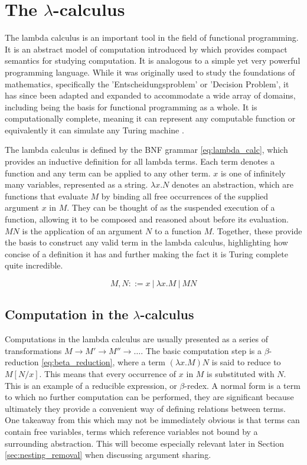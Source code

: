 \documentclass[12pt,a4paper]{report}
\theoremstyle{definition}
\theoremstyle{remark}
\begin{document}
\section{The \texorpdfstring{$\lambda$}{lambda}-calculus}
The lambda calculus is an important tool in the field of functional programming. It is an abstract model of computation introduced by \cite{church_1936} which provides compact semantics for studying computation. It is analogous to a simple yet very powerful programming language. While it was originally used to study the foundations of mathematics, specifically the 'Entscheidungsproblem' or 'Decision Problem', it has since been adapted and expanded to accommodate a wide array of domains, including being the basis for functional programming as a whole. It is computationally complete, meaning it can represent any computable function or equivalently it can simulate any Turing machine \cite{turing_1937}.

The lambda calculus is defined by the BNF grammar \eqref{eq:lambda_calc}, which provides an inductive definition for all lambda terms. Each term denotes a function and any term can be applied to any other term. $x$ is one of infinitely many variables, represented as a string. $\lambda x.N$ denotes an abstraction, which are functions that evaluate $M$ by binding all free occurrences of the supplied argument $x$ in $M$. They can be thought of as the suspended execution of a function, allowing it to be composed and reasoned about before its evaluation. $MN$ is the application of an argument $N$ to a function $M$. Together, these provide the basis to construct any valid term in the lambda calculus, highlighting how concise of a definition it has and further making the fact it is Turing complete quite incredible.

\begin{equation}\label{eq:lambda_calc}
    M,N ::= x\ |\ \lambda x.M\ |\ MN
\end{equation}
\subsection{Computation in the \texorpdfstring{$\lambda$}{lambda}-calculus}

Computations in the lambda calculus are usually presented as a series of transformations $M \rightarrow M' \rightarrow M'' \rightarrow \ldots$. The basic computation step is a $\beta$-reduction \eqref{eq:beta_reduction}, where a term $(\lambda x.M)N$ is said to reduce to $M[N/x]$. This means that every occurrence of $x$ in $M$ is substituted with $N$. This is an example of a reducible expression, or $\beta$-redex. A normal form is a term to which no further computation can be performed, they are significant because ultimately they provide a convenient way of defining relations between terms. One takeaway from this which may not be immediately obvious is that terms can contain free variables, terms which reference variables not bound by a surrounding abstraction. This will become especially relevant later in Section \ref{sec:nesting_removal} when discussing argument sharing.
\end{document}
